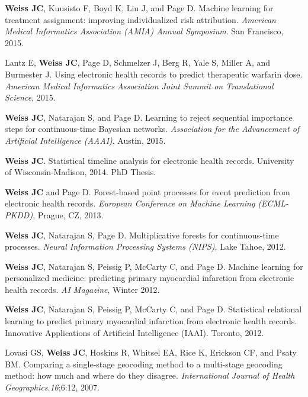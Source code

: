 \begin{bibsection}

\item  \textbf{Weiss JC}, Kuusisto F, Boyd K, Liu J, and Page D. Machine learning for treatment assignment: improving individualized risk attribution. \textit{American Medical Informatics Association (AMIA) Annual Symposium}. San Francisco, 2015.

\item  Lantz E, \textbf{Weiss JC}, Page D, Schmelzer J, Berg R, Yale S, Miller A, and Burmester J. Using electronic health records to predict therapeutic warfarin dose. \textit{American Medical Informatics Association Joint Summit on Translational Science}, 2015.

\item  \textbf{Weiss JC}, Natarajan S, and Page D. Learning to reject sequential importance steps for continuous-time Bayesian networks. \textit{Association for the Advancement of Artificial Intelligence (AAAI)}. Austin, 2015.

\item  \textbf{Weiss JC}. Statistical timeline analysis for electronic health records. University of Wisconsin-Madison, 2014. PhD Thesis.

\item  \textbf{Weiss JC} and Page D. Forest-based point processes for event prediction from electronic health records. \textit{European Conference on Machine Learning (ECML-PKDD)}, Prague, CZ, 2013.

\item  \textbf{Weiss JC}, Natarajan S, Page D. Multiplicative forests for continuous-time processes. \textit{Neural Information Processing Systems (NIPS)}, Lake Tahoe, 2012.

\item  \textbf{Weiss JC}, Natarajan S, Peissig P, McCarty C, and Page D. Machine learning for personalized medicine: predicting primary myocardial infarction from electronic health records. \textit{AI Magazine}, Winter 2012.

\item  \textbf{Weiss JC}, Natarajan S, Peissig P, McCarty C, and Page D. Statistical relational learning to predict primary myocardial infarction from electronic health records. Innovative Applications of Artificial Intelligence (IAAI). Toronto, 2012.

\item  Lovasi GS, \textbf{Weiss JC}, Hoskins R, Whitsel EA, Rice K, Erickson CF, and Psaty BM. Comparing a single-stage geocoding method to a multi-stage geocoding method: how much and where do they disagree. \textit{International Journal of Health Geographics}.\textit{16};6:12, 2007.
  
\end{bibsection}

